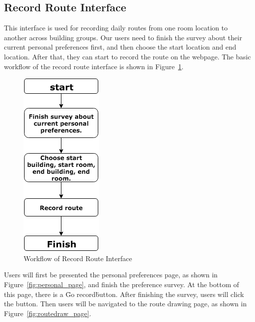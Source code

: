 \documentclass{sigchi}
\begin{document}
\subsection{Record Route Interface}
This interface is used for recording daily routes from one room location to another across building groups. Our users need to finish the survey about their current personal preferences first, and then choose the start location and end location. After that, they can start to record the route on the webpage. The basic workflow of the record route interface is shown in Figure~\ref{fig:label-ui-flow}.

\begin{figure}[!h]
\centering
\includegraphics[width=0.4\columnwidth]{pics/label-ui-flow.png}
\caption{Workflow of Record Route Interface}
\label{fig:label-ui-flow}
\end{figure}

Users will first be presented the personal preferences page, as shown in Figure~\ref{fig:personal_page}, and finish the preference survey. At the bottom of this page, there is a \"Go record\" button. After finishing the survey, users will click the button. Then users will be navigated to the route drawing page, as shown in Figure~\ref{fig:routedraw_page}.
\end{document}
